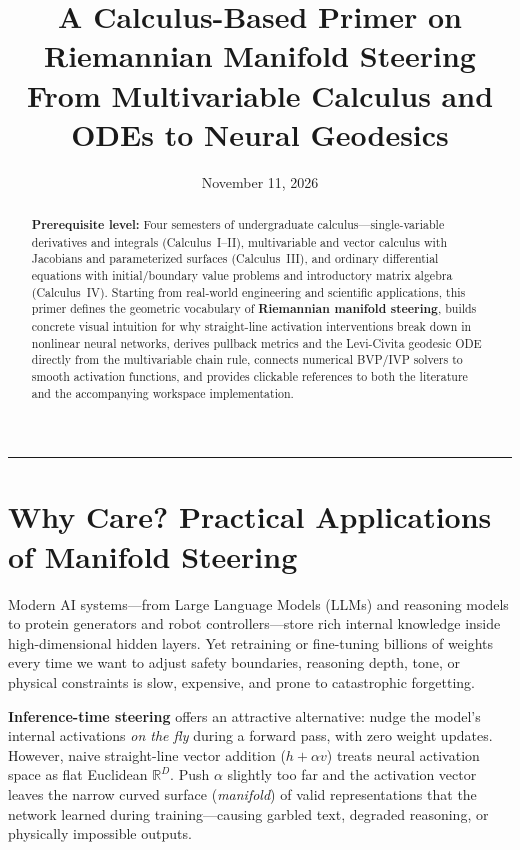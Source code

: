 \documentclass[11pt,a4paper]{article}
\title{\textbf{A Calculus-Based Primer on Riemannian Manifold Steering}\\[0.4em]
\large From Multivariable Calculus and ODEs to Neural Geodesics}
\author{}
\date{November 11, 2026}
\newcommand{\R}{\mathbb{R}}
\theoremstyle{definition}
\begin{document}
\maketitle

\begin{abstract}
\noindent
\textbf{Prerequisite level:} Four semesters of undergraduate calculus---single-variable derivatives and integrals (Calculus~I--II), multivariable and vector calculus with Jacobians and parameterized surfaces (Calculus~III), and ordinary differential equations with initial/boundary value problems and introductory matrix algebra (Calculus~IV). Starting from real-world engineering and scientific applications, this primer defines the geometric vocabulary of \textbf{Riemannian manifold steering}, builds concrete visual intuition for why straight-line activation interventions break down in nonlinear neural networks, derives pullback metrics and the Levi-Civita geodesic ODE directly from the multivariable chain rule, connects numerical BVP/IVP solvers to smooth activation functions, and provides clickable references to both the literature and the accompanying workspace implementation.
\end{abstract}

\tableofcontents

\vspace{0.75em}
\hrule
\vspace{0.75em}

\section{Why Care? Practical Applications of Manifold Steering}
\label{sec:applications}

Modern AI systems---from Large Language Models (LLMs) and reasoning models to protein generators and robot controllers---store rich internal knowledge inside high-dimensional hidden layers. Yet retraining or fine-tuning billions of weights every time we want to adjust safety boundaries, reasoning depth, tone, or physical constraints is slow, expensive, and prone to catastrophic forgetting.

\textbf{Inference-time steering} offers an attractive alternative: nudge the model's internal activations \emph{on the fly} during a forward pass, with zero weight updates. However, naive straight-line vector addition ($h + \alpha v$) treats neural activation space as flat Euclidean $\R^D$. Push $\alpha$ slightly too far and the activation vector leaves the narrow curved surface (\emph{manifold}) of valid representations that the network learned during training---causing garbled text, degraded reasoning, or physically impossible outputs.
\end{document}
